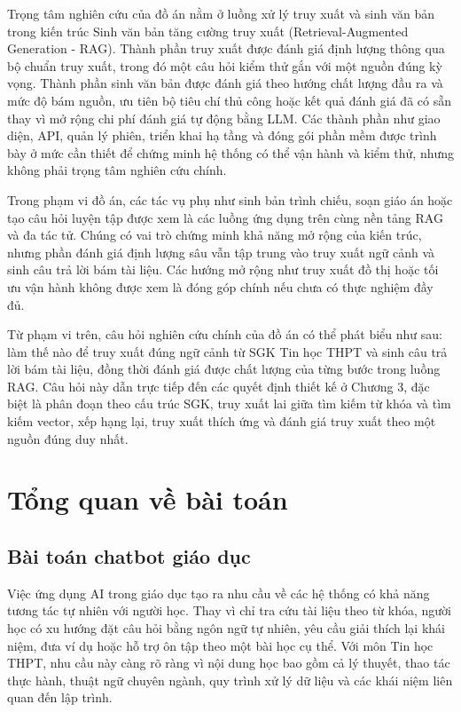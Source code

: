 \documentclass[../DoAn.tex]{subfiles}
\begin{document}
Trọng tâm nghiên cứu của đồ án nằm ở luồng xử lý truy xuất và sinh văn bản trong kiến trúc Sinh văn bản tăng cường truy xuất (Retrieval-Augmented Generation - RAG). Thành phần truy xuất được đánh giá định lượng thông qua bộ chuẩn truy xuất, trong đó một câu hỏi kiểm thử gắn với một nguồn đúng kỳ vọng. Thành phần sinh văn bản được đánh giá theo hướng chất lượng đầu ra và mức độ bám nguồn, ưu tiên bộ tiêu chí thủ công hoặc kết quả đánh giá đã có sẵn thay vì mở rộng chi phí đánh giá tự động bằng LLM. Các thành phần như giao diện, API, quản lý phiên, triển khai hạ tầng và đóng gói phần mềm được trình bày ở mức cần thiết để chứng minh hệ thống có thể vận hành và kiểm thử, nhưng không phải trọng tâm nghiên cứu chính.

Trong phạm vi đồ án, các tác vụ phụ như sinh bản trình chiếu, soạn giáo án hoặc tạo câu hỏi luyện tập được xem là các luồng ứng dụng trên cùng nền tảng RAG và đa tác tử. Chúng có vai trò chứng minh khả năng mở rộng của kiến trúc, nhưng phần đánh giá định lượng sâu vẫn tập trung vào truy xuất ngữ cảnh và sinh câu trả lời bám tài liệu. Các hướng mở rộng như truy xuất đồ thị hoặc tối ưu vận hành không được xem là đóng góp chính nếu chưa có thực nghiệm đầy đủ.

Từ phạm vi trên, câu hỏi nghiên cứu chính của đồ án có thể phát biểu như sau: làm thế nào để truy xuất đúng ngữ cảnh từ SGK Tin học THPT và sinh câu trả lời bám tài liệu, đồng thời đánh giá được chất lượng của từng bước trong luồng RAG. Câu hỏi này dẫn trực tiếp đến các quyết định thiết kế ở Chương 3, đặc biệt là phân đoạn theo cấu trúc SGK, truy xuất lai giữa tìm kiếm từ khóa và tìm kiếm vector, xếp hạng lại, truy xuất thích ứng và đánh giá truy xuất theo một nguồn đúng duy nhất.

\section{Tổng quan về bài toán}

\subsection{Bài toán chatbot giáo dục}

Việc ứng dụng AI trong giáo dục tạo ra nhu cầu về các hệ thống có khả năng tương tác tự nhiên với người học. Thay vì chỉ tra cứu tài liệu theo từ khóa, người học có xu hướng đặt câu hỏi bằng ngôn ngữ tự nhiên, yêu cầu giải thích lại khái niệm, đưa ví dụ hoặc hỗ trợ ôn tập theo một bài học cụ thể. Với môn Tin học THPT, nhu cầu này càng rõ ràng vì nội dung học bao gồm cả lý thuyết, thao tác thực hành, thuật ngữ chuyên ngành, quy trình xử lý dữ liệu và các khái niệm liên quan đến lập trình.
\end{document}
